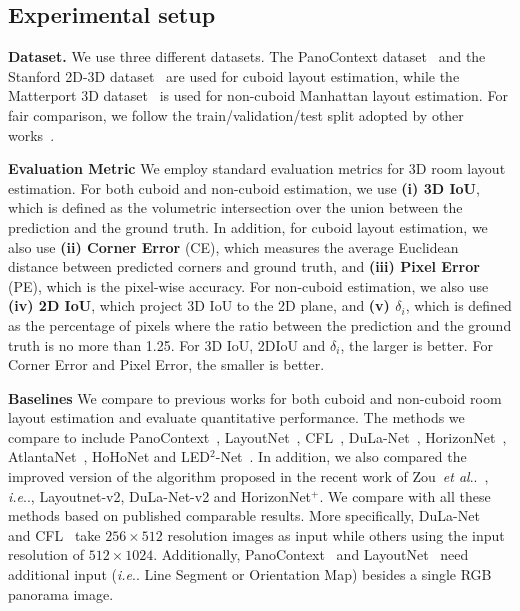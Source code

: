 \documentclass[runningheads]{llncs}
\makeatletter
\DeclareRobustCommand\onedot{\futurelet\@let@token\@onedot}
\def\@onedot{\ifx\@let@token.\else.\null\fi\xspace}
\def\ie{\emph{i.e}\onedot} \def\Ie{\emph{I.e}\onedot}
\def\etal{\emph{et al}\onedot}
\makeatother
\begin{document}
\subsection{Experimental setup}
\noindent\textbf{Dataset.} We use three different datasets. The PanoContext dataset~\cite{zhang2014panocontext} and the Stanford 2D-3D dataset~\cite{armeni2017joint,zou2018layoutnet} are used for cuboid layout estimation, while the Matterport 3D dataset~\cite{Matterport3D} is used for non-cuboid Manhattan layout estimation. For fair comparison, we follow the train/validation/test split adopted by other works~\cite{zou2018layoutnet,sun2019horizonnet,zou2021_layoutv2}.

\noindent\textbf{Evaluation Metric}
We employ standard evaluation metrics for 3D room layout estimation. For both cuboid and non-cuboid estimation, we use \textbf{(i) 3D IoU}, which is defined as the volumetric intersection over the union between the prediction and the ground truth. In addition, for cuboid layout estimation, we also use \textbf{(ii) Corner Error} (CE), which measures the average Euclidean distance between predicted corners and ground truth, and \textbf{(iii) Pixel Error} (PE), which is the pixel-wise accuracy. For non-cuboid estimation, we also use \textbf{(iv) 2D IoU}, which project 3D IoU to the 2D plane, and \textbf{(v) $\delta_{i}$}, which is defined as the percentage of pixels where the ratio between the prediction and the ground truth is no more than 1.25. For 3D IoU, 2DIoU and $\delta_{i}$, the larger is better. For Corner Error and Pixel Error, the smaller is better. 

\noindent\textbf{Baselines}
We compare to previous works for both cuboid and non-cuboid room layout estimation and evaluate quantitative performance.
The methods we compare to include PanoContext~\cite{zhang2014panocontext}, LayoutNet~\cite{zou2018layoutnet}, CFL~\cite{fernandez2020corners}, DuLa-Net~\cite{yang2019dula}, HorizonNet~\cite{sun2019horizonnet}, AtlantaNet~\cite{pintore2020atlantanet}, HoHoNet\cite{Sun_2021_HoHoNet} and LED$^2$-Net~\cite{Wang_2021_LED2Net}. 
In addition, we also compared the improved version of the algorithm proposed in the recent work of Zou~\etal~\cite{zou2021_layoutv2}, \ie, Layoutnet-v2, DuLa-Net-v2 and HorizonNet$^+$.
We compare with all these methods based on published comparable results.
More specifically, DuLa-Net~\cite{yang2019dula} and CFL~\cite{fernandez2020corners} take $256\times512$ resolution images as input while others using the input resolution of $512\times1024$.
Additionally, PanoContext~\cite{zhang2014panocontext} and LayoutNet~\cite{zou2018layoutnet} need additional input (\ie Line Segment or Orientation Map) besides a single RGB panorama image.
\end{document}
